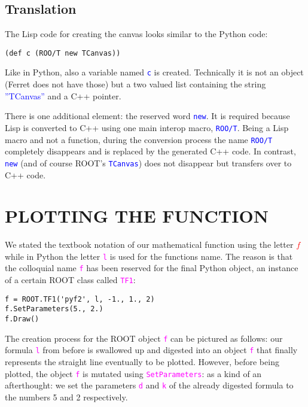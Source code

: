 \documentclass{IEEEcsmag}
\begin{document}
\subsection{Translation} 
The Lisp code for creating the canvas looks similar to the Python code:
{\color{blue}\begin{verbatim}
(def c (ROO/T new TCanvas))
\end{verbatim}}
Like in Python, also a variable named \texttt{\textcolor{blue}{c}} is created. Technically it is not an object (Ferret does not have those) but a two valued list containing the string \textcolor{blue}{”TCanvas”}  and a C++ pointer.

There is one additional element: the reserved word \texttt{\textcolor{blue}{new}}. It is required because Lisp is converted to C++ using one main interop macro, \texttt{\textcolor{blue}{ROO/T}}. Being a Lisp macro and not a function, during the conversion process the name \texttt{\textcolor{blue}{ROO/T}} completely disappears and is replaced by the generated C++ code. In contrast, \texttt{\textcolor{blue}{new}} (and of course ROOT’s \texttt{\textcolor{blue}{TCanvas}}) does not disappear but transfers over to C++ code.\vspace*{-5pt}

\section{PLOTTING THE FUNCTION}
We stated the textbook notation of our mathematical function using the letter \textcolor{red}{$f$} while in Python the letter \texttt{\textcolor{magenta}{l}} is used for the functions name. The reason is that the colloquial name \texttt{\textcolor{magenta}{f}} has been reserved for the final Python object, an instance of a certain ROOT class called \texttt{\textcolor{magenta}{TF1}}:
{\color{magenta}\begin{verbatim}
f = ROOT.TF1('pyf2', l, -1., 1., 2)
f.SetParameters(5., 2.)
f.Draw()
\end{verbatim}}
The creation process for the ROOT object \texttt{\textcolor{magenta}{f}} can be pictured as follows: our formula \texttt{\textcolor{magenta}{l}} from before is
swallowed up and digested into an object \texttt{\textcolor{magenta}{f}} that finally represents the straight line eventually to be plotted. However, before being plotted, the object \texttt{\textcolor{magenta}{f}} is mutated using \texttt{\textcolor{magenta}{SetParameters}}: as a kind of an afterthought: we set the parameters \texttt{\textcolor{magenta}{d}} and \texttt{\textcolor{magenta}{k}} of the already digested formula to the numbers 5 and 2 respectively.
\end{document}

